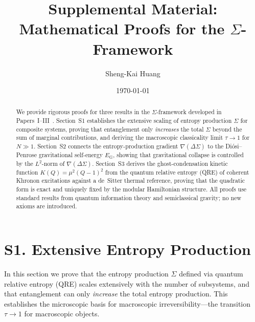 \documentclass[letterpaper,twocolumn,superscriptaddress,longbibliography]{revtex4-2}
\newcommand{\tauasym}{\tau}
\newcommand{\EG}{E_{\mathrm{G}}}
\newcommand{\DSigma}{\Delta\Sigma}
\begin{document}
\title{Supplemental Material:\\
Mathematical Proofs for the $\Sigma$-Framework}

\author{Sheng-Kai Huang}

\date{\today}

\begin{abstract}
We provide rigorous proofs for three results in the
$\Sigma$-framework developed in Papers~I--III~\cite{PaperI,PaperII,PaperIII}.
Section~S1 establishes the extensive scaling of entropy production
$\Sigma$ for composite systems, proving that entanglement only
\emph{increases} the total $\Sigma$ beyond the sum of marginal
contributions, and deriving the macroscopic classicality limit
$\tauasym \to 1$ for $N \gg 1$.
Section~S2 connects the entropy-production gradient $\nabla(\DSigma)$
to the Di\'{o}si--Penrose gravitational self-energy $\EG$, showing
that gravitational collapse is controlled by the $L^2$-norm of
$\nabla(\DSigma)$.
Section~S3 derives the ghost-condensation kinetic function
$K(Q) = \mu^2(Q-1)^2$ from the quantum relative entropy (QRE) of
coherent Khronon excitations against a de~Sitter thermal reference,
proving that the quadratic form is exact and uniquely fixed by the
modular Hamiltonian structure.
All proofs use standard results from quantum information theory
and semiclassical gravity; no new axioms are introduced.
\end{abstract}

\maketitle

\tableofcontents

\section{S1. Extensive Entropy Production}
\label{sec:extensive}

In this section we prove that the entropy production $\Sigma$
defined via quantum relative entropy (QRE) scales extensively with
the number of subsystems, and that entanglement can only
\emph{increase} the total entropy production.
This establishes the microscopic basis for
macroscopic irreversibility---the transition
$\tauasym \to 1$ for macroscopic objects.
\end{document}
